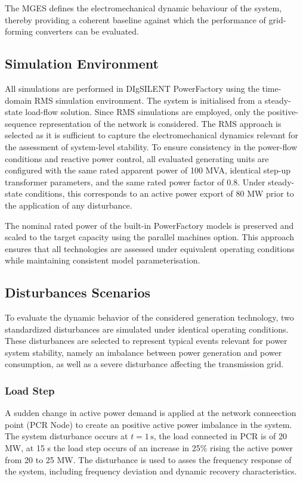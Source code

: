     The MGES defines the electromechanical dynamic behaviour of the system, thereby providing a coherent baseline against which the performance of grid-forming converters can be evaluated.

\subsection{Simulation Environment}
All simulations are performed in DIgSILENT PowerFactory using the time-domain RMS simulation environment. The system is initialised from a steady-state load-flow solution.
Since RMS simulations are employed, only the positive-sequence representation of the network is considered. The RMS approach is selected as it is sufficient to capture the
electromechanical dynamics relevant for the assessment of system-level stability. To ensure consistency in the power-flow conditions and reactive power control, all
evaluated generating units are configured with the same rated apparent power of 100 MVA, identical step-up transformer parameters, and the same rated power factor of 0.8. Under steady-state conditions, this corresponds to an active power export of 80 MW prior to the application of any disturbance.

The nominal rated power of the built-in PowerFactory models is preserved and scaled to the target capacity using the parallel machines option. This approach ensures that all technologies are assessed under equivalent operating conditions while maintaining
consistent model parameterisation.

\subsection{Disturbances Scenarios}

To evaluate the dynamic behavior of the considered generation technology, two standardized disturbances are simulated under identical operating conditions. These disturbances are selected to represent typical events relevant for power system stability, namely an imbalance between power generation and power consumption, as well
as a severe disturbance affecting the transmission grid.

\subsubsection{Load Step}
A sudden change in active power demand is applied at the network conneection point (PCR Node) to create an positive active power imbalance in the system. The system disturbance occurs at $t = 1\,\mathrm{s}$, the load connected in PCR is of 20 MW, at 15 s the load step occurs of an increase in 25\% rising the active power from 20 to 25 MW. The disturbance is used to asses the frequency response of the system, including frequency deviation and dynamic recovery characteristics. 

